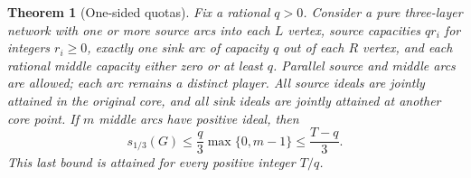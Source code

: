\documentclass[11pt]{article}
\newtheorem{theorem}{Theorem}[section]
\theoremstyle{remark}
\begin{document}
\begin{theorem}[One-sided quotas]\label{flow:quota}
Fix a rational $q>0$. Consider a pure three-layer network with one or more source
arcs into each $L$ vertex, source capacities $q r_i$ for integers
$r_i\ge0$, exactly one sink arc of capacity $q$ out of each $R$ vertex,
and each rational middle capacity either zero or at least $q$. Parallel source
and middle arcs are allowed; each arc remains a distinct player.
All source ideals are jointly attained in the original core, and all
sink ideals are jointly attained at another core point. If $m$ middle
arcs have positive ideal, then
\begin{equation}\label{flow:quota-bound}
 s_{1/3}(G)\le\frac q3\max\{0,m-1\}\le\frac{T-q}{3}.
\end{equation}
This last bound is attained for every positive integer $T/q$.
\end{theorem}
\end{document}
